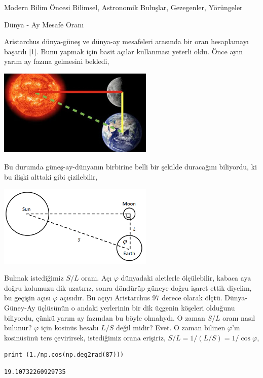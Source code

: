 \documentclass[12pt,fleqn]{article}\usepackage{../../common}
\begin{document}
Modern Bilim Öncesi Bilimsel, Astronomik Buluşlar, Gezegenler, Yörüngeler

Dünya - Ay Mesafe Oranı

Aristarchus dünya-güneş ve dünya-ay mesafeleri arasında bir oran hesaplamayı
başardı [1]. Bunu yapmak için basit açılar kullanması yeterli oldu. Önce ayın
yarım ay fazına gelmesini bekledi,

\includegraphics[width=20em]{moonshad.jpg}

Bu durumda güneş-ay-dünyanın birbirine belli bir şekilde duracağını biliyordu, ki
bu ilişki alttaki gibi çizilebilir,

\includegraphics[width=20em]{sunmoon.png}

Bulmak istediğimiz $S/L$ oranı. Açı $\varphi$ dünyadaki aletlerle ölçülebilir,
kabaca aya doğru kolumuzu dik uzatırız, sonra döndürüp güneye doğru işaret ettik
diyelim, bu geçişin açısı $\varphi$ açısıdır. Bu açıyı Aristarchus 97 derece
olarak ölçtü. Dünya-Güney-Ay üçlüsünün o andaki yerlerinin bir dik üçgenin
köşeleri olduğunu biliyordu, çünkü yarım ay fazından bu böyle olmalıydı. O zaman
$S/L$ oranı nasıl bulunur? $\varphi$ için kosinüs hesabı $L/S$ değil midir?
Evet. O zaman bilinen $\varphi$'ın kosinüsünü ters çevirirsek, istediğimiz orana
erişiriz, $S/L = 1/(L/S) = 1 / \cos\varphi$,

\begin{verbatim}
print (1./np.cos(np.deg2rad(87)))
\end{verbatim}

\begin{verbatim}
19.10732260929735
\end{verbatim}
\end{document}
